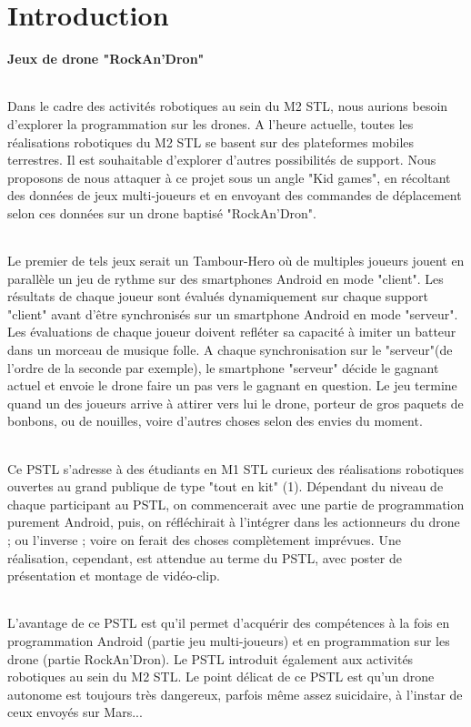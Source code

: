 \part{Introduction}

\textbf{Jeux de drone "RockAn’Dron"}

\paragraph{}
Dans le cadre des activités robotiques au sein du M2 STL, nous aurions besoin d’explorer la programmation sur les drones. A l’heure actuelle, toutes les réalisations robotiques du M2 STL se basent sur des plateformes mobiles terrestres. Il est souhaitable d’explorer d’autres possibilités de support. Nous proposons de nous attaquer à ce projet sous un angle "Kid games", en récoltant des données de jeux multi-joueurs et en envoyant des commandes de déplacement selon ces données sur un drone baptisé "RockAn’Dron".

\paragraph{}
Le premier de tels jeux serait un Tambour-Hero où de multiples joueurs jouent en parallèle un jeu de rythme sur des smartphones Android en mode "client". Les résultats de chaque joueur sont évalués dynamiquement sur chaque support "client" avant d’être synchronisés sur un smartphone Android en mode "serveur". Les évaluations de chaque joueur doivent refléter sa capacité à imiter un batteur dans un morceau de musique folle. A chaque synchronisation sur le "serveur"(de l’ordre de la seconde par exemple), le smartphone "serveur" décide le gagnant actuel et envoie le drone faire un pas vers le gagnant en question. Le jeu termine quand un des joueurs arrive à attirer vers lui le drone, porteur de gros paquets de bonbons, ou de nouilles, voire d’autres choses selon des envies du moment.

\paragraph{}
Ce PSTL s’adresse à des étudiants en M1 STL curieux des réalisations robotiques ouvertes au grand publique de type "tout en kit" (1). Dépendant du niveau de chaque participant au PSTL, on commencerait avec une partie de programmation purement Android, puis, on réfléchirait à l’intégrer dans les actionneurs du drone ; ou l’inverse ; voire on ferait des choses complètement imprévues. Une réalisation, cependant, est attendue au terme du PSTL, avec poster de présentation et montage de vidéo-clip.

\paragraph{}
L’avantage de ce PSTL est qu’il permet d’acquérir des compétences à la fois en programmation Android (partie jeu multi-joueurs) et en programmation sur les drone (partie RockAn’Dron). Le PSTL introduit également aux activités robotiques au sein du M2 STL. Le point délicat de ce PSTL est qu’un drone autonome est toujours très dangereux, parfois même assez suicidaire, à l’instar de ceux envoyés sur Mars...